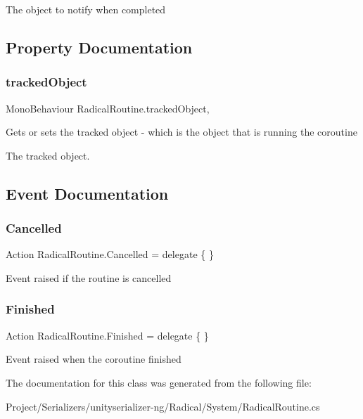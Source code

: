 The object to notify when completed 



\subsection{Property Documentation}
\mbox{\label{class_radical_routine_a235e7bd6879257332c2836c021bae75e}} 
\subsubsection{\texorpdfstring{tracked\+Object}{trackedObject}}
{\footnotesize\ttfamily Mono\+Behaviour Radical\+Routine.\+tracked\+Object\hspace{0.3cm}{\ttfamily [get]}, {\ttfamily [set]}}



Gets or sets the tracked object -\/ which is the object that is running the coroutine 

The tracked object. 

\subsection{Event Documentation}
\mbox{\label{class_radical_routine_ad10d1a30c327b9c8613b10c7a274a57e}} 
\subsubsection{\texorpdfstring{Cancelled}{Cancelled}}
{\footnotesize\ttfamily Action Radical\+Routine.\+Cancelled = delegate \{ \}}



Event raised if the routine is cancelled 

\mbox{\label{class_radical_routine_a4c372aa10c0c69be8156aa821ec7dd46}} 
\subsubsection{\texorpdfstring{Finished}{Finished}}
{\footnotesize\ttfamily Action Radical\+Routine.\+Finished = delegate \{ \}}



Event raised when the coroutine finished 



The documentation for this class was generated from the following file\+:\begin{DoxyCompactItemize}
\item 
Project/\+Serializers/unityserializer-\/ng/\+Radical/\+System/Radical\+Routine.\+cs\end{DoxyCompactItemize}
